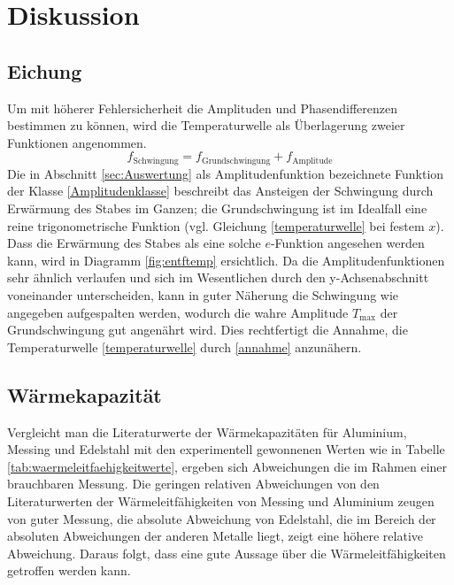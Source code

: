 \section{Diskussion}
\label{sec:Diskussion}
\subsection{Eichung}
Um mit höherer Fehlersicherheit die Amplituden und Phasendifferenzen bestimmen zu können, wird die Temperaturwelle als Überlagerung zweier Funktionen angenommen. 
\begin{equation}
	\label{annahme}
	f_\text{Schwingung}= f_\text{Grundschwingung}+f_\text{Amplitude}
\end{equation}
Die in Abschnitt \ref{sec:Auswertung} als Amplitudenfunktion bezeichnete Funktion der Klasse \eqref{Amplitudenklasse} beschreibt das Ansteigen der Schwingung durch Erwärmung des Stabes im Ganzen; die Grundschwingung ist im Idealfall eine reine trigonometrische Funktion (vgl. Gleichung \ref{temperaturwelle} bei festem $x$). 
Dass die Erwärmung des Stabes als eine solche $e$-Funktion angesehen werden kann, wird in Diagramm \ref{fig:entftemp} ersichtlich.
Da die Amplitudenfunktionen sehr ähnlich verlaufen und sich im Wesentlichen durch den y-Achsenabschnitt voneinander unterscheiden, kann in guter Näherung die Schwingung wie angegeben aufgespalten werden, wodurch die wahre Amplitude $T_\text{max}$ der Grundschwingung gut angenährt wird.
Dies rechtfertigt die Annahme, die Temperaturwelle \ref{temperaturwelle} durch \eqref{annahme} anzunähern.


\subsection{Wärmekapazität}
Vergleicht man die Literaturwerte der Wärmekapazitäten für Aluminium, Messing und Edelstahl mit den experimentell gewonnenen Werten wie in Tabelle \ref{tab:waermeleitfaehigkeitwerte}, ergeben sich Abweichungen die im Rahmen einer brauchbaren Messung.
Die geringen relativen Abweichungen von den Literaturwerten der Wärmeleitfähigkeiten von Messing und Aluminium zeugen von guter Messung, 
die absolute Abweichung von Edelstahl, die im Bereich der absoluten Abweichungen der anderen Metalle liegt, zeigt eine höhere relative Abweichung.
Daraus folgt, dass eine gute Aussage über die Wärmeleitfähigkeiten getroffen werden kann.

